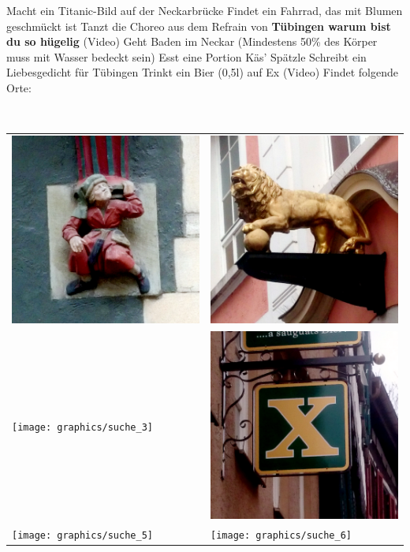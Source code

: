 \documentclass[11pt,paper=a4,answers]{exam}
\renewenvironment{questions}{
	\begin{q}
		\pointsinrightmargin
		\marginpointname{\ Pkt}
		\bracketedpoints }{
	\end{q}}
\begin{document}
	\begin{questions}
		\question[5] Macht ein Titanic-Bild auf der Neckarbrücke
		\question[5] Findet ein Fahrrad, das mit Blumen geschmückt ist
		\question[20] Tanzt die Choreo aus dem Refrain von \textbf{Tübingen warum bist du so hügelig} (Video)
		\question[50] Geht Baden im Neckar (Mindestens 50\% des Körper muss mit Wasser bedeckt sein)
		\question[5] Esst eine Portion Käs' Spätzle
		\question[10] Schreibt ein Liebesgedicht für Tübingen
		\question[5] Trinkt ein Bier (0,5l) auf Ex (Video)
		\marginpointname{}
		 Findet folgende Orte:
		
	\end{questions}
\ \\
\noindent
\begin{tabularx}{19cm}{XX}
	\includegraphics[width=7.5cm]{graphics/suche_1} & \includegraphics[width=7.5cm]{graphics/suche_2} \\ \texttt{[image: graphics/suche\_3]} & \includegraphics[width=7.5cm]{graphics/suche_4} \\ \texttt{[image: graphics/suche\_5]} & \texttt{[image: graphics/suche\_6]}
\end{tabularx}
\end{document}
